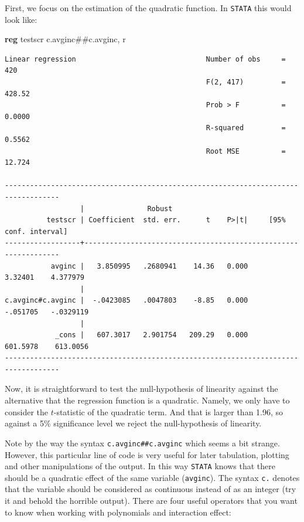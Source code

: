 \documentclass[
]{book}
\newenvironment{Shaded}{\begin{snugshade}}{\end{snugshade}}
\newcommand{\FunctionTok}[1]{\textcolor[rgb]{0.00,0.00,0.00}{#1}}
\newcommand{\KeywordTok}[1]{\textcolor[rgb]{0.13,0.29,0.53}{\textbf{#1}}}
\newcommand{\NormalTok}[1]{#1}
\begin{document}
First, we focus on the estimation of the quadratic function. In \texttt{STATA} this would look like:

\begin{Shaded}
\begin{Highlighting}[]
\KeywordTok{reg}\NormalTok{ testscr c.avginc\#\#c.avginc, }\FunctionTok{r}
\end{Highlighting}
\end{Shaded}

\begin{verbatim}
Linear regression                               Number of obs     =        420
                                                F(2, 417)         =     428.52
                                                Prob > F          =     0.0000
                                                R-squared         =     0.5562
                                                Root MSE          =     12.724

-----------------------------------------------------------------------------------
                  |               Robust
          testscr | Coefficient  std. err.      t    P>|t|     [95% conf. interval]
------------------+----------------------------------------------------------------
           avginc |   3.850995   .2680941    14.36   0.000      3.32401    4.377979
                  |
c.avginc#c.avginc |  -.0423085   .0047803    -8.85   0.000     -.051705   -.0329119
                  |
            _cons |   607.3017   2.901754   209.29   0.000     601.5978    613.0056
-----------------------------------------------------------------------------------
\end{verbatim}

Now, it is straightforward to test the null-hypothesis of linearity against the alternative that the regression function is a quadratic. Namely, we only have to consider the \(t\)-statistic of the quadratic term. And that is larger than 1.96, so against a 5\% significance level we reject the null-hypothesis of linearity.

Note by the way the syntax \texttt{c.avginc\#\#c.avginc} which seems a bit strange. However, this particular line of code is very useful for later tabulation, plotting and other manipulations of the output. In this way \texttt{STATA} knows that there should be a quadratic effect of the same variable (\texttt{avginc}). The syntax \texttt{c.} denotes that the variable should be considered as continuous instead of as an integer (try it and behold the horrible output). There are four useful operators that you want to know when working with polynomials and interaction effect:
\end{document}

